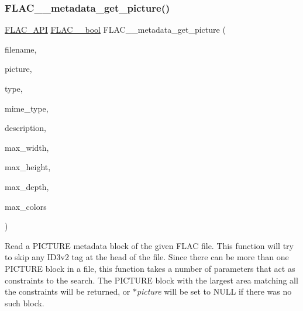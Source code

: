 \subsubsection{\texorpdfstring{FLAC\_\_metadata\_get\_picture()}{FLAC\_\_metadata\_get\_picture()}}
{\footnotesize\ttfamily \mbox{\hyperlink{group__flac__export_ga56ca07df8a23310707732b1c0007d6f5}{F\+L\+A\+C\+\_\+\+A\+PI}} \mbox{\hyperlink{ordinals_8h_a95103469f1cbd78b8cf250194985b34e}{F\+L\+A\+C\+\_\+\+\_\+bool}} F\+L\+A\+C\+\_\+\+\_\+metadata\+\_\+get\+\_\+picture (\begin{DoxyParamCaption}\item[{const char $\ast$}]{filename,  }\item[{\mbox{\hyperlink{struct_f_l_a_c_____stream_metadata}{F\+L\+A\+C\+\_\+\+\_\+\+Stream\+Metadata}} $\ast$$\ast$}]{picture,  }\item[{\mbox{\hyperlink{group__flac__format_gaf6d3e836cee023e0b8d897f1fdc9825d}{F\+L\+A\+C\+\_\+\+\_\+\+Stream\+Metadata\+\_\+\+Picture\+\_\+\+Type}}}]{type,  }\item[{const char $\ast$}]{mime\+\_\+type,  }\item[{const \mbox{\hyperlink{ordinals_8h_a5eb569b12d5b047cdacada4d57924ee3}{F\+L\+A\+C\+\_\+\+\_\+byte}} $\ast$}]{description,  }\item[{unsigned}]{max\+\_\+width,  }\item[{unsigned}]{max\+\_\+height,  }\item[{unsigned}]{max\+\_\+depth,  }\item[{unsigned}]{max\+\_\+colors }\end{DoxyParamCaption})}

Read a P\+I\+C\+T\+U\+RE metadata block of the given F\+L\+AC file. This function will try to skip any I\+D3v2 tag at the head of the file. Since there can be more than one P\+I\+C\+T\+U\+RE block in a file, this function takes a number of parameters that act as constraints to the search. The P\+I\+C\+T\+U\+RE block with the largest area matching all the constraints will be returned, or {\itshape $\ast$picture} will be set to {\ttfamily N\+U\+LL} if there was no such block.


